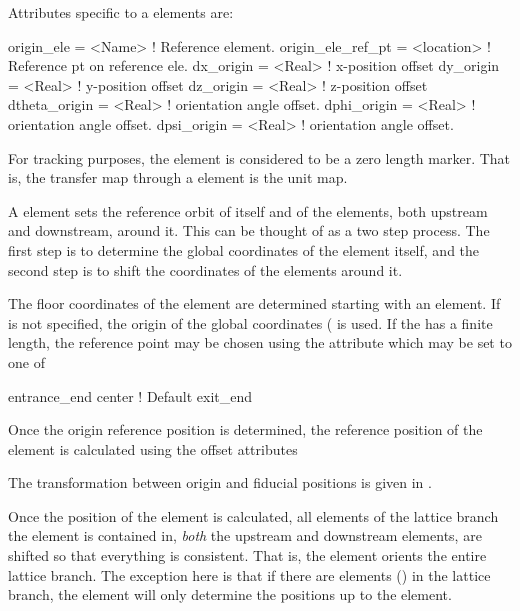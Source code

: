 Attributes specific to a  elements are:
\begin{example}
  origin_ele        = <Name>     ! Reference element.
  origin_ele_ref_pt = <location> ! Reference pt on reference ele.
  dx_origin         = <Real>     ! x-position offset
  dy_origin         = <Real>     ! y-position offset
  dz_origin         = <Real>     ! z-position offset
  dtheta_origin     = <Real>     ! orientation angle offset.
  dphi_origin       = <Real>     ! orientation angle offset.
  dpsi_origin       = <Real>     ! orientation angle offset.
\end{example}

For tracking purposes, the  element is considered to be a
zero length marker. That is, the transfer map through a 
element is the unit map.

A  element sets the reference orbit of itself and of the
elements, both upstream and downstream, around it. This can be thought
of as a two step process. The first step is to determine the global
coordinates of the  element itself, and the second step is
to shift the coordinates of the elements around it.

The floor coordinates of the  element are determined
starting with an  element. If  is not
specified, the origin of the global coordinates ( is
used. If the  has a finite length, the reference point
may be chosen using the  attribute which
may be set to one of
\begin{example}
  entrance_end
  center         ! Default
  exit_end
\end{example}

Once the origin reference position is determined, the reference
position of the  element is calculated using the offset
attributes 
\begin{example}
\end{example}
The transformation between origin and fiducial positions is given in
.

Once the position of the  element is calculated, all
elements of the lattice branch the  element is contained
in, {\em both} the upstream and downstream elements, are shifted so
that everything is consistent. That is, the  element
orients the entire lattice branch. The exception here is that if there
are   elements () in the lattice
branch, the  element will only determine the positions up
to the   element. 

